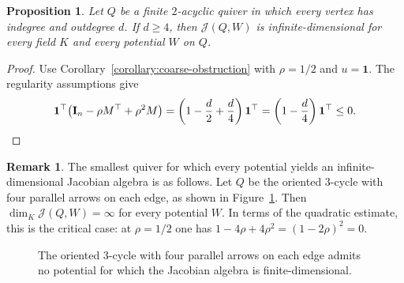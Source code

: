 \documentclass[11pt,letterpaper,reqno]{amsart}
\newtheorem{proposition}[proposition]{Proposition}
\theoremstyle{definition}
\newtheorem{remark}[remark]{Remark}
\newcommand{\one}{\mathbf 1}
\newcommand{\Jac}{\mathcal J}
\begin{document}
\begin{proposition}
	\label{proposition:regular-quivers}
	Let $Q$ be a finite $2$-acyclic quiver in which every vertex has indegree and
	outdegree $d$.  If $d\geq4$, then $\Jac(Q,W)$ is infinite-dimensional for
	every field $K$ and every potential $W$ on $Q$.
\end{proposition}

\begin{proof}
	Use Corollary~\ref{corollary:coarse-obstruction} with
	$\rho=1/2$ and $u=\one$.  The regularity assumptions give
	\[
	\one^{\top}
	\bigl({\bf I}_{n}-\rho M^{\top}+\rho^2M\bigr)
	=\left(1-\frac d2+\frac d4\right)\one^{\top}
	=\left(1-\frac d4\right)\one^{\top}\leq0.
	\qedhere
	\]
\end{proof}

\begin{remark}
The smallest quiver for which every potential yields an infinite-dimensional Jacobian algebra is as follows.
Let $Q$ be the oriented
	$3$-cycle with four parallel arrows on each edge, as shown in
	Figure~\ref{fig:four-regular-triangle}.  Then $\dim_K\Jac(Q,W)=\infty$
	for every potential $W$.  In terms of the quadratic estimate, this is the
	critical case: at $\rho=1/2$ one has $1-4\rho+4\rho^2=(1-2\rho)^2=0$.
\end{remark}

\begin{figure}[htbp]
	\centering

	\caption{The oriented 3-cycle with four parallel arrows on each edge admits no potential for which the Jacobian algebra is finite-dimensional.}
	\label{fig:four-regular-triangle}
\end{figure}
\end{document}

